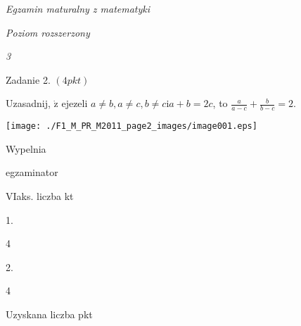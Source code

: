 \documentclass[a4paper,12pt]{article}
\begin{document}
{\it Egzamin maturalny z matematyki}

{\it Poziom rozszerzony}

{\it 3}

Zadanie 2. $(4pkt)$

Uzasadnij, $\dot{\mathrm{z}}$ ejezeli $a\neq b, a\neq c, b\neq c\mathrm{i}a+b=2c$, to $\displaystyle \frac{a}{a-c}+\frac{b}{b-c}=2.$
\begin{center}
\texttt{[image: ./F1\_M\_PR\_M2011\_page2\_images/image001.eps]}
\end{center}
Wypelnia

egzaminator

VIaks. liczba kt

1.

4

2.

4

Uzyskana liczba pkt
\end{document}
